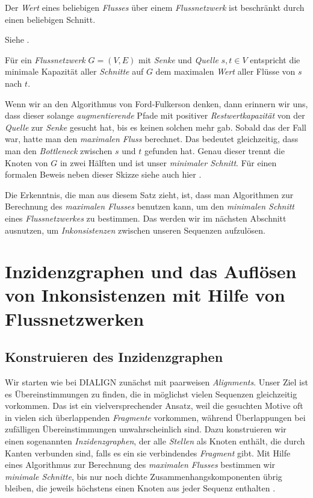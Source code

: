 \begin{lemma}
	Der \emph{Wert} eines beliebigen \emph{Flusses} über einem \emph{Flussnetzwerk} ist beschränkt durch einen beliebigen Schnitt.
\end{lemma}

\begin{beweis}
	Siehe \cite{clrs09}.
\end{beweis}

\begin{satz}
	Für ein \emph{Flussnetzwerk} $G = (V,E)$ mit \emph{Senke} und \emph{Quelle} $s, t \in V$ entspricht die minimale Kapazität aller \emph{Schnitte} auf $G$ dem maximalen \emph{Wert} aller Flüsse von $s$ nach $t$. 
\end{satz} 

\begin{beweis}
	Wenn wir an den Algorithmus von Ford-Fulkerson denken, dann erinnern wir uns, dass dieser solange \emph{augmentierende} Pfade mit positiver \emph{Restwertkapazität} von der \emph{Quelle} zur \emph{Senke} gesucht hat, bis es keinen solchen mehr gab. Sobald das der Fall war, hatte man den \emph{maximalen Fluss} berechnet. Das bedeutet gleichzeitig, dass man den \emph{Bottleneck} zwischen $s$ und $t$ gefunden hat. Genau dieser trennt die Knoten von $G$ in zwei Hälften und ist unser \emph{minimaler Schnitt}. Für einen formalen Beweis neben dieser Skizze siehe auch hier \cite{clrs09}.
\end{beweis} 

Die Erkenntnis, die man aus diesem Satz zieht, ist, dass man Algorithmen zur Berechnung des \emph{maximalen Flusses} benutzen kann, um den \emph{minimalen Schnitt} eines \emph{Flussnetzwerkes} zu bestimmen. Das werden wir im nächsten Abschnitt ausnutzen, um \emph{Inkonsistenzen} zwischen unseren Sequenzen aufzulösen.

\section{Inzidenzgraphen und das Auflösen von Inkonsistenzen mit Hilfe von Flussnetzwerken}

\subsection{Konstruieren des Inzidenzgraphen}

Wir starten wie bei DIALIGN	zunächst mit paarweisen \emph{Alignments}. Unser Ziel ist es Übereinstimmungen zu finden, die in möglichst vielen Sequenzen gleichzeitig vorkommen. Das ist ein vielversprechender Ansatz, weil die gesuchten Motive oft in vielen sich überlappenden \emph{Fragmente} vorkommen, während Überlappungen bei zufälligen Übereinstimmungen unwahrscheinlich sind. Dazu konstruieren wir einen sogenannten \emph{Inzidenzgraphen}, der alle \emph{Stellen} als Knoten enthält, die durch Kanten verbunden sind, falls es ein sie verbindendes \emph{Fragment} gibt. Mit Hilfe eines Algorithmus zur Berechnung des \emph{maximalen Flusses} bestimmen wir \emph{minimale Schnitte}, bis nur noch dichte Zusammenhangskomponenten übrig bleiben, die jeweils höchstens einen Knoten aus jeder Sequenz enthalten \citep{cpm10}.

